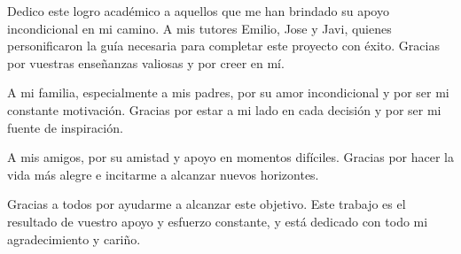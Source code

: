 \documentclass[11pt,a4paper,titlepage,oneside]{report}
\begin{document}


\paxinaenbranco
\begin{agradecementos}
	Dedico este logro académico a aquellos que me han brindado su apoyo incondicional en mi camino. A mis tutores Emilio, Jose y Javi, quienes personificaron la guía necesaria para completar este proyecto con éxito. Gracias por vuestras enseñanzas valiosas y por creer en mí.

	A mi familia, especialmente a mis padres, por su amor incondicional y por ser mi constante motivación. Gracias por estar a mi lado en cada decisión y por ser mi fuente de inspiración.

	A mis amigos, por su amistad y apoyo en momentos difíciles. Gracias por hacer la vida más alegre e incitarme a alcanzar nuevos horizontes.

	Gracias a todos por ayudarme a alcanzar este objetivo. Este trabajo es el resultado de vuestro apoyo y esfuerzo constante, y está dedicado con todo mi agradecimiento y cariño.
\end{agradecementos}


\setcounter{page}{1}

\tableofcontents
\listoffigures
\listoftables
\clearpage

\setcounter{page}{1}











\appendix
\appendixpage



\printglossary[type=\acronymtype,title=\nomeglosarioacronimos]
\printglossary[title=\nomeglosariotermos]



\clearpage
\end{document}
